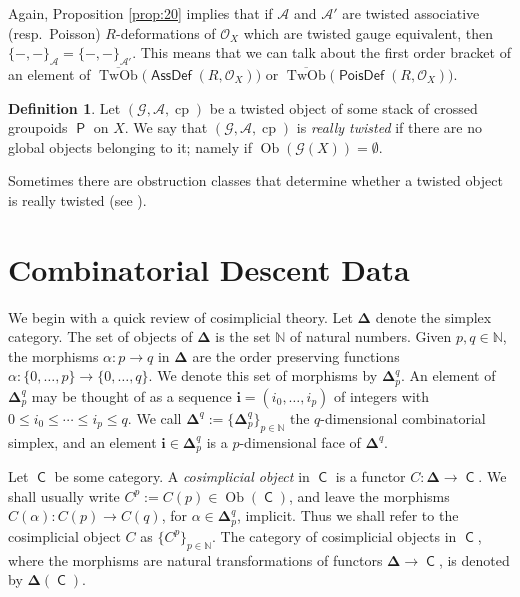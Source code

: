 \documentclass[a4paper, 10pt]{amsart}
\theoremstyle{definition}
\newtheorem{dfn}[equation]{Definition}
\numberwithin{equation}{section}
\newcommand{\opn}{\operatorname}
\newcommand{\cat}[1]{\operatorname{\mathsf{#1}}}
\newcommand{\ol}{\overline}
\newcommand{\mcal}[1]{\mathcal{#1}}
\newcommand{\mbb}[1]{\mathbb{#1}}
\newcommand{\tup}[1]{\textup{#1}}
\newcommand{\bsym}[1]{\boldsymbol{#1}}
\newcommand{\gerbe}[1]{\bsym{\mcal{#1}}}
\newcommand{\twocat}[1]{\operatorname{\bsym{\cat{#1}}}}
\begin{document}
Again, Proposition \ref{prop:20}  implies that if $\gerbe{A}$ and
$\gerbe{A}'$ are twisted associative 
\tup{(}resp.\ Poisson\tup{)} $R$-deformations of $\mcal{O}_X$ which
are twisted gauge equivalent, then 
$\{ -,- \}_{\gerbe{A}} = \{ -,- \}_{\gerbe{A}'}$.
This means that we can talk about the first order bracket of an
element of \linebreak
$\ol{\opn{TwOb}} \bigl( \twocat{AssDef}(R, \mcal{O}_X) \bigr)$
or
$\ol{\opn{TwOb}} \bigl( \twocat{PoisDef}(R, \mcal{O}_X) \bigr)$.

\begin{dfn} \label{dfn:25}
Let $(\gerbe{G}, \gerbe{A}, \opn{cp})$ be a twisted object of some
stack of crossed groupoids $\twocat{P}$ on $X$. We say that 
$(\gerbe{G}, \gerbe{A}, \opn{cp})$ is {\em really twisted} if there are no
global objects belonging to it; namely if 
$\opn{Ob} (\gerbe{G}(X)) = \emptyset$.
\end{dfn}

Sometimes there are obstruction classes that determine whether a
twisted object is really twisted (see \cite[Section 4]{Ye4}).





\section{Combinatorial Descent Data}
\label{sec:cosim}

We begin with a quick review of cosimplicial theory. 
Let $\bsym{\Delta}$ denote the simplex category. The set
of objects of $\bsym{\Delta}$ is the set $\mbb{N}$ of natural
numbers. Given $p, q \in \mbb{N}$, the morphisms $\alpha : p \to q$
in $\bsym{\Delta}$ are the order preserving functions
$\alpha : \{ 0, \ldots, p \} \to \{ 0, \ldots, q \}$.
We denote this set of morphisms by
$\bsym{\Delta}^q_p$.
An element of $\bsym{\Delta}^q_p$ may be thought of as a sequence
$\bsym{i} = (i_0, \ldots, i_p)$ of integers with
$0 \leq i_0 \leq \cdots \leq i_p \leq q$. 
We call 
$\bsym{\Delta}^q := \{ \bsym{\Delta}^q_p \}_{p \in \mbb{N}}$
the $q$-dimensional combinatorial simplex, and an element
$\bsym{i} \in \bsym{\Delta}^q_p$ is a $p$-dimensional face of
$\bsym{\Delta}^q$. 

Let $\cat{C}$ be some category. A {\em cosimplicial object} in 
$\cat{C}$ is a functor $C : \bsym{\Delta} \to \cat{C}$.
We shall usually write $C^p := C(p) \in \opn{Ob} (\cat{C})$, and leave
the morphisms
$C(\alpha) : C(p) \to C(q)$, for $\alpha \in \bsym{\Delta}^q_p$,
implicit. Thus we shall refer to the cosimplicial object $C$ as
$\{ C^p \}_{p \in \mbb{N}}$.
The category of cosimplicial objects in $\cat{C}$, where the morphisms 
are natural transformations of functors 
$\bsym{\Delta} \to \cat{C}$, is denoted by 
$\bsym{\Delta}(\cat{C})$.
\end{document}
